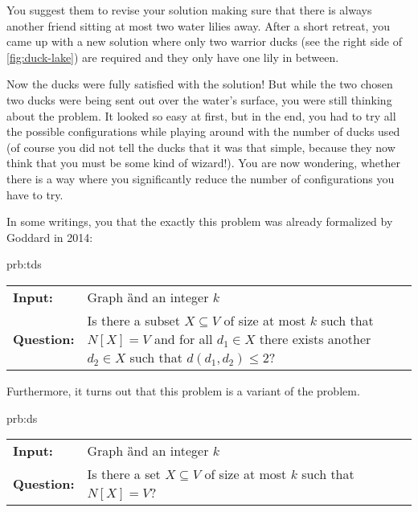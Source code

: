 You suggest them to revise your solution making sure that there is always another friend sitting at most two water lilies away. After a short retreat, you came up with a new solution where only two warrior ducks (see the right side of \cref{fig:duck-lake}) are required and they only have one lily in between. 

Now the ducks were fully satisfied with the solution! But while the two chosen two ducks were being sent out over the water's surface, you were still thinking about the problem.
It looked so easy at first, but in the end, you had to try all the possible configurations while playing around with the number of ducks used (of course you did not tell the ducks that it was that simple, because they now think that you must be some kind of wizard!). 
You are now wondering, whether there is a way where you significantly reduce the number of configurations you have to try.

In some writings, you that the exactly this problem was already formalized by Goddard in 2014: 

\begin{prb}{prb:tds}
    
    \begin{tabularx}{0.8\textwidth}{>{\hsize=0.35\hsize}X>{\hsize=0.8\hsize}X}
        \textbf{Input:} & Graph \G and an integer $k$\\
        \textbf{Question:} & Is there a subset $X \subseteq V$ of size at most $k$ such that $N[X] = V$ and for all $d_1 \in X$ there exists another $d_2 \in X$ such that $d(d_1, d_2) \leq 2$?\\
    \end{tabularx}
        
\end{prb}

Furthermore, it turns out that this problem is a variant of the \dom problem.

\begin{prb}{prb:ds}
    \begin{tabularx}{0.9\textwidth}{>{\hsize=0.30\hsize}X>{\hsize=0.8\hsize}X}
        \textbf{Input:} & Graph \G and an integer $k$\\
        \textbf{Question:} & Is there a set $X \subseteq V$ of size at most $k$ such that $N[X] = V$? \\
    \end{tabularx}
\end{prb}


